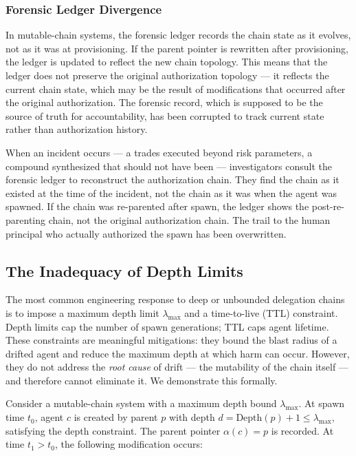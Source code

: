 \subsubsection{Forensic Ledger Divergence}
\label{sec:ledger-divergence}

In mutable-chain systems, the forensic ledger records the chain state as it evolves, not as it was at provisioning. If the parent pointer is rewritten after provisioning, the ledger is updated to reflect the new chain topology. This means that the ledger does not preserve the original authorization topology — it reflects the current chain state, which may be the result of modifications that occurred after the original authorization. The forensic record, which is supposed to be the source of truth for accountability, has been corrupted to track current state rather than authorization history.

When an incident occurs — a trades executed beyond risk parameters, a compound synthesized that should not have been — investigators consult the forensic ledger to reconstruct the authorization chain. They find the chain as it existed at the time of the incident, not the chain as it was when the agent was spawned. If the chain was re-parented after spawn, the ledger shows the post-re-parenting chain, not the original authorization chain. The trail to the human principal who actually authorized the spawn has been overwritten.

\subsection{The Inadequacy of Depth Limits}
\label{sec:depth-limits-insufficient}

The most common engineering response to deep or unbounded delegation chains is to impose a maximum depth limit $\lambda_{\text{max}}$ and a time-to-live (TTL) constraint. Depth limits cap the number of spawn generations; TTL caps agent lifetime. These constraints are meaningful mitigations: they bound the blast radius of a drifted agent and reduce the maximum depth at which harm can occur. However, they do not address the \emph{root cause} of drift — the mutability of the chain itself — and therefore cannot eliminate it. We demonstrate this formally.

Consider a mutable-chain system with a maximum depth bound $\lambda_{\text{max}}$. At spawn time $t_0$, agent $c$ is created by parent $p$ with depth $d = \text{Depth}(p) + 1 \leq \lambda_{\text{max}}$, satisfying the depth constraint. The parent pointer $\alpha(c) = p$ is recorded. At time $t_1 > t_0$, the following modification occurs:

